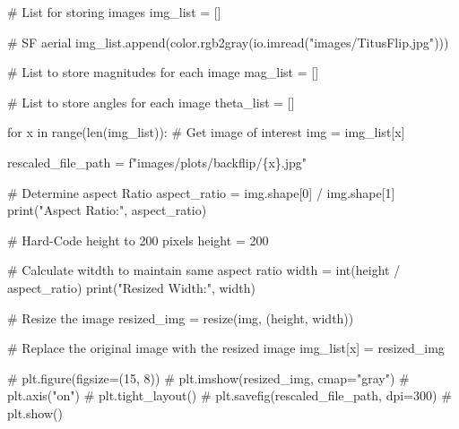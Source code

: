 \documentclass[
  letterpaper,
  DIV=11,
  numbers=noendperiod]{scrreprt}
\newenvironment{Shaded}{\begin{snugshade}}{\end{snugshade}}
\newcommand{\BuiltInTok}[1]{\textcolor[rgb]{0.00,0.23,0.31}{#1}}
\newcommand{\CommentTok}[1]{\textcolor[rgb]{0.37,0.37,0.37}{#1}}
\newcommand{\ControlFlowTok}[1]{\textcolor[rgb]{0.00,0.23,0.31}{#1}}
\newcommand{\DecValTok}[1]{\textcolor[rgb]{0.68,0.00,0.00}{#1}}
\newcommand{\KeywordTok}[1]{\textcolor[rgb]{0.00,0.23,0.31}{#1}}
\newcommand{\NormalTok}[1]{\textcolor[rgb]{0.00,0.23,0.31}{#1}}
\newcommand{\OperatorTok}[1]{\textcolor[rgb]{0.37,0.37,0.37}{#1}}
\newcommand{\SpecialCharTok}[1]{\textcolor[rgb]{0.37,0.37,0.37}{#1}}
\newcommand{\SpecialStringTok}[1]{\textcolor[rgb]{0.13,0.47,0.30}{#1}}
\newcommand{\StringTok}[1]{\textcolor[rgb]{0.13,0.47,0.30}{#1}}
\begin{document}
\begin{Shaded}
\begin{Highlighting}[]
\CommentTok{\# List for storing images}
\NormalTok{img\_list }\OperatorTok{=}\NormalTok{ []}

\CommentTok{\# SF aerial}
\NormalTok{img\_list.append(color.rgb2gray(io.imread(}\StringTok{"images/TitusFlip.jpg"}\NormalTok{)))}

\CommentTok{\# List to store magnitudes for each image}
\NormalTok{mag\_list }\OperatorTok{=}\NormalTok{ []}

\CommentTok{\# List to store angles for each image}
\NormalTok{theta\_list }\OperatorTok{=}\NormalTok{ []}


\ControlFlowTok{for}\NormalTok{ x }\KeywordTok{in} \BuiltInTok{range}\NormalTok{(}\BuiltInTok{len}\NormalTok{(img\_list)):}
    \CommentTok{\# Get image of interest}
\NormalTok{    img }\OperatorTok{=}\NormalTok{ img\_list[x]}

\NormalTok{    rescaled\_file\_path }\OperatorTok{=} \SpecialStringTok{f"images/plots/backflip/}\SpecialCharTok{\{}\NormalTok{x}\SpecialCharTok{\}}\SpecialStringTok{.jpg"}

    \CommentTok{\# Determine aspect Ratio}
\NormalTok{    aspect\_ratio }\OperatorTok{=}\NormalTok{ img.shape[}\DecValTok{0}\NormalTok{] }\OperatorTok{/}\NormalTok{ img.shape[}\DecValTok{1}\NormalTok{]}
    \BuiltInTok{print}\NormalTok{(}\StringTok{"Aspect Ratio:"}\NormalTok{, aspect\_ratio)}

    \CommentTok{\# Hard{-}Code height to 200 pixels}
\NormalTok{    height }\OperatorTok{=} \DecValTok{200}

    \CommentTok{\# Calculate witdth to maintain same aspect ratio}
\NormalTok{    width }\OperatorTok{=} \BuiltInTok{int}\NormalTok{(height }\OperatorTok{/}\NormalTok{ aspect\_ratio)}
    \BuiltInTok{print}\NormalTok{(}\StringTok{"Resized Width:"}\NormalTok{, width)}

    \CommentTok{\# Resize the image}
\NormalTok{    resized\_img }\OperatorTok{=}\NormalTok{ resize(img, (height, width))}

    \CommentTok{\# Replace the original image with the resized image}
\NormalTok{    img\_list[x] }\OperatorTok{=}\NormalTok{ resized\_img}

    \CommentTok{\# plt.figure(figsize=(15, 8))}
    \CommentTok{\# plt.imshow(resized\_img, cmap="gray")}
    \CommentTok{\# plt.axis("on")}
    \CommentTok{\# plt.tight\_layout()}
    \CommentTok{\# plt.savefig(rescaled\_file\_path, dpi=300)}
    \CommentTok{\# plt.show()}


\end{Highlighting}
\end{Shaded}
\end{document}
